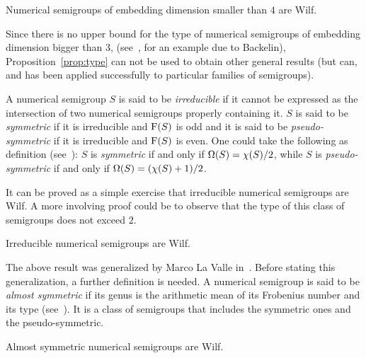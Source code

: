 \begin{theorem}\label{th:type<=3}
    Numerical semigroups of embedding dimension smaller than $4$ are Wilf. 
\end{theorem}

Since there is no upper bound for the type of numerical semigroups of embedding dimension bigger than $3$, (see~\cite[pg.~75]{FroebergGottliebHaeggkvist1987SF-numerical}, for an example due to Backelin), Proposition~\ref{prop:type} can not be used to obtain other general results (but can, and has been applied successfully to particular families of semigroups).


A numerical semigroup $S$ is said to be \emph{irreducible} if it cannot be expressed as the intersection of
two numerical semigroups properly containing it.
$S$ is said to be \emph{symmetric} if it is irreducible and $\operatorname{F}(S)$ is odd and it is said to be \emph{pseudo-symmetric} if it is irreducible and $\operatorname{F}(S)$ is even.
One could take the following as definition (see~\cite[Cor~4.5]{RosalesGarcia2009Book-Numerical}): $S$ is \emph{symmetric} if and only if $\operatorname{\Omega}(S) = \operatorname{\chi}(S)/2$, while $S$ is \emph{pseudo-symmetric} if and only if $\operatorname{\Omega}(S) = (\operatorname{\chi}(S)+1)/2$. 

It can be proved as a simple exercise that irreducible numerical semigroups are Wilf. A more involving proof could be to observe that the type of this class of semigroups does not exceed $2$. 
\begin{proposition}\label{wilf-particular:irreducible}
    Irreducible numerical semigroups are Wilf.
    
\end{proposition}
The above result was generalized by Marco La Valle in~\cite[Th. 5.5]{Barucci2009}. Before stating this generalization, a further definition is needed.
A numerical semigroup is said to be \emph{almost symmetric} if its genus is the arithmetic mean of its Frobenius number and its type (see~\cite{BarucciFroeberg1997JA-One-dimensional}). %
It is a class of semigroups that includes the symmetric ones and the pseudo-symmetric. 

\begin{proposition}\label{prop:wilf-almost-symmetric}
	Almost symmetric numerical semigroups are Wilf.
\end{proposition}

